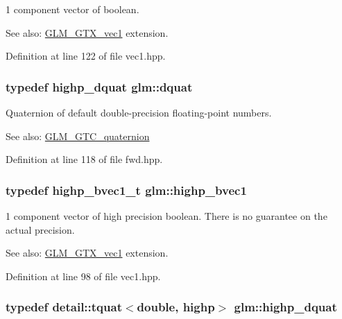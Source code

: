 1 component vector of boolean. \begin{Desc}
\item[See also:]\hyperlink{group__gtx__vec1}{GLM\_\-GTX\_\-vec1} extension. \end{Desc}


Definition at line 122 of file vec1.hpp.\hypertarget{namespaceglm_49693161673a003b4a8fd4d8b15b0b7b}{
\subsubsection[dquat]{\setlength{\rightskip}{0pt plus 5cm}typedef {\bf highp\_\-dquat} {\bf glm::dquat}}}
\label{namespaceglm_49693161673a003b4a8fd4d8b15b0b7b}


Quaternion of default double-precision floating-point numbers.

\begin{Desc}
\item[See also:]\hyperlink{group__gtc__quaternion}{GLM\_\-GTC\_\-quaternion} \end{Desc}


Definition at line 118 of file fwd.hpp.\hypertarget{namespaceglm_d24a2ac97dbfbece48f504224bb20b59}{
\subsubsection[highp\_\-bvec1]{\setlength{\rightskip}{0pt plus 5cm}typedef highp\_\-bvec1\_\-t {\bf glm::highp\_\-bvec1}}}
\label{namespaceglm_d24a2ac97dbfbece48f504224bb20b59}


1 component vector of high precision boolean. There is no guarantee on the actual precision. \begin{Desc}
\item[See also:]\hyperlink{group__gtx__vec1}{GLM\_\-GTX\_\-vec1} extension. \end{Desc}


Definition at line 98 of file vec1.hpp.\hypertarget{namespaceglm_6504747f6a2ec4a369a51244fcabc61e}{
\subsubsection[highp\_\-dquat]{\setlength{\rightskip}{0pt plus 5cm}typedef detail::tquat$<$double, highp$>$ {\bf glm::highp\_\-dquat}}}
\label{namespaceglm_6504747f6a2ec4a369a51244fcabc61e}


